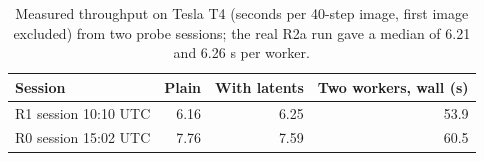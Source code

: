 \begin{table}[t]
\centering\small
\caption{Measured throughput on Tesla T4 (seconds per 40-step image, first image excluded) from two probe sessions; the real R2a run gave a median of 6.21 and 6.26 s per worker.}
\label{tab:throughput}
\begin{tabular}{lrrr}
\toprule
Session & Plain & With latents & Two workers, wall (s) \\
\midrule
R1 session 10:10 UTC & 6.16 & 6.25 & 53.9 \\
R0 session 15:02 UTC & 7.76 & 7.59 & 60.5 \\
\bottomrule
\end{tabular}
\end{table}

